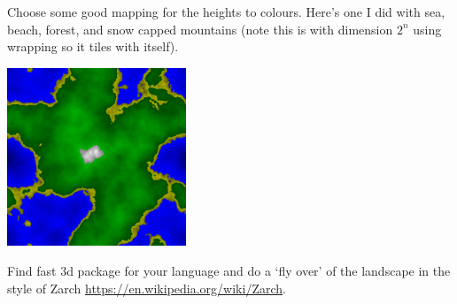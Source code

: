\documentclass{article}
\begin{document}
        Choose some good mapping for the heights to colours.  Here's one I did with sea, beach, forest, and snow capped mountains (note 
        this is with dimension $2^n$ using wrapping so it tiles with itself).
        
        \begin{center}
            \includegraphics[width=0.4\textwidth]{land}
        \end{center}
        
        Find fast 3d package for your language and do a `fly over' of the landscape in the style of Zarch 
        \url{https://en.wikipedia.org/wiki/Zarch}.
\end{document}
